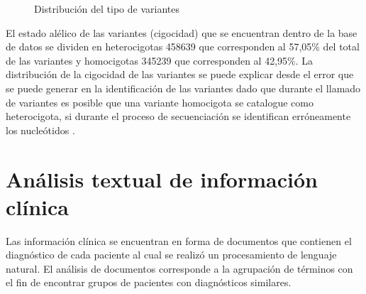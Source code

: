 \begin{figure}[H]
	\centering
	\caption{Distribución del tipo de variantes}
	\label{f:variantesgeneral}
\end{figure}

El estado alélico de las variantes (cigocidad) que se encuentran dentro de la base de datos se dividen en heterocigotas 458639 que corresponden al 57,05\% del total de las variantes  y homocigotas 345239 que corresponden al 42,95\%. La distribución de la cigocidad de las variantes se puede explicar desde el error que se puede generar en la identificación de las variantes dado que durante el llamado  de variantes es posible que una variante homocigota se catalogue como heterocigota, si durante el proceso de secuenciación se identifican erróneamente los nucleótidos \cite{Babraham2016}\cite{Pirooznia2014}. 

\section{Análisis textual de información clínica}

Las información clínica se encuentran en forma de documentos que contienen el diagnóstico de cada paciente al cual se realizó un procesamiento de lenguaje natural. El análisis de documentos corresponde a la agrupación de términos con el fin de encontrar grupos de pacientes con diagnósticos similares.
 
